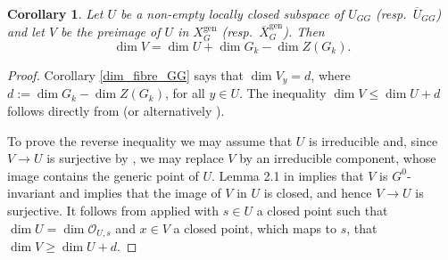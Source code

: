 \documentclass{amsart}
\newtheorem{cor}[prop]{Corollary}
\theoremstyle{definition}
\theoremstyle{remark}
\newcommand{\OO}{\mathcal O}
\newcommand{\gen}{\mathrm{gen}}
\newcommand{\Xbar}{\overline{X}}
\newcommand{\Ubar}{\overline{U}}
\begin{document}
\begin{cor}\label{UV_GG} 
Let $U$ be a non-empty locally closed subspace of $U_{GG}$ (resp.~$\Ubar_{GG}$) and 
let $V$ be the preimage of $U$ in $X^{\gen}_G$ (resp.~$\Xbar^{\gen}_G$). Then 
$$\dim V = \dim U +\dim G_k -\dim Z(G_k).$$
\end{cor}
\begin{proof} Corollary \ref{dim_fibre_GG} says that $\dim V_{y}=d$, where
$d:=\dim G_k -\dim Z(G_k)$, for all $y\in U$. The inequality 
$\dim V \le \dim U +d$
follows directly from \cite[Lemma 3.18 (6)]{BIP_new} (or alternatively \cite[\href{https://stacks.math.columbia.edu/tag/0BAG}{Tag 0BAG}]{stacks-project}). 

To prove the reverse inequality we may assume that $U$ is irreducible and, since 
$V\rightarrow U$ is surjective by \cite[Theorem 3 (ii)]{seshadri}, we may replace $V$ 
by an irreducible component, whose image contains the generic point of $U$. Lemma 2.1 
in \cite{BIP_new} implies that $V$ is $G^0$-invariant and \cite[Theorem 3 (iii)]{seshadri} 
implies that the image of $V$ in $U$ is closed, and hence $V\rightarrow U$ is surjective.
It follows from \cite[\href{https://stacks.math.columbia.edu/tag/02JU}{Tag 02JU}]{stacks-project}
applied with $s\in U$ a closed point such that $\dim U=\dim \OO_{U, s}$ and 
$x\in V$ a closed point, which maps to $s$, that $\dim V\ge \dim U+d$. 
\end{proof}
\end{document}
